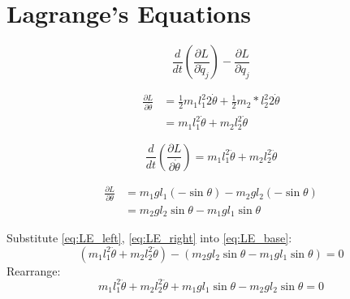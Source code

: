 \documentclass[titlepage]{article}
\numberwithin{equation}{section}
\begin{document}
\section{Lagrange's Equations}
\begin{equation} \label{eq:LE_base}
\frac{d}{dt} \left(\frac{\partial L}{\partial \dot{q}_j}\right) - \frac{\partial L}{\partial q_j}
\end{equation}

\bigskip
\begin{align}
\frac{\partial L}{\partial \dot{\theta}} &= \frac{1}{2} m_1 l_1^2 2 \dot{\theta} + \frac{1}{2} m_2 * l_2^2 2 \dot{\theta} \\
&= m_1 l_1^2 \dot{\theta} + m_2 l_2^2 \dot{\theta}
\end{align}

\bigskip
\begin{equation} \label{eq:LE_left}
\frac{d}{dt} \left(\frac{\partial L}{\partial \dot{\theta}}\right) = m_1 l_1^2 \ddot{\theta} + m_2 l_2^2 \ddot{\theta}
\end{equation}

\bigskip
\begin{align}
\frac{\partial L}{\partial \theta} &= m_1 g l_1 (-\sin \theta) - m_2 g l_2 (-\sin \theta) \\
&= m_2 g l_2 \sin \theta - m_1 g l_1 \sin \theta \label{eq:LE_right}
\end{align}

\bigskip
\noindent
Substitute \ref{eq:LE_left}, \ref{eq:LE_right} into \ref{eq:LE_base}:
\begin{equation}
(m_1 l_1^2 \ddot{\theta} + m_2 l_2^2 \ddot{\theta}) - (m_2 g l_2 \sin \theta - m_1 g l_1 \sin \theta) = 0
\end{equation}
Rearrange:
\begin{equation}
m_1 l_1^2 \ddot{\theta} + m_2 l_2^2 \ddot{\theta} + m_1 g l_1 \sin \theta - m_2 g l_2 \sin \theta = 0
\end{equation}
\end{document}
